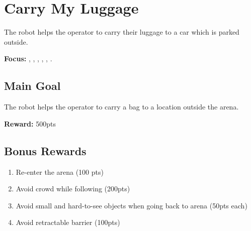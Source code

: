 \section{Carry My Luggage}
\label{test:carry-my-luggage}
The robot helps the operator to carry their luggage to a car which is parked outside.

\noindent \textbf{Focus:} \SysI{}, \HRI{}, \PerDet{}, \PerRec, \NAV{}, \MAP{}.

\subsection*{Main Goal}
The robot helps the operator to carry a bag to a location outside the arena.

\noindent\textbf{Reward:} 500pts

\subsection*{Bonus Rewards}
\begin{enumerate}[nosep]
	\item Re-enter the arena (100 pts)
	\item Avoid crowd while following (200pts)
	\item Avoid small and hard-to-see objects when going back to arena (50pts each)
	\item Avoid retractable barrier (100pts)
\end{enumerate}


